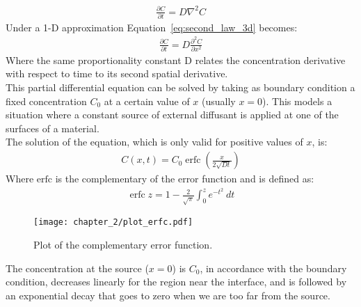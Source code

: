 \begin{align}
   \frac{\partial C}{\partial t}=D\nabla^2C \label{eq:second_law_3d}
\end{align}
Under a 1-D approximation Equation~\ref{eq:second_law_3d} becomes:
\begin{align}
   \frac{\partial C}{\partial t}=D\frac{\partial^2C}{\partial x^2} \label{eq:second_law_1d}
\end{align}
Where the same proportionality constant D relates the concentration derivative with respect to time to its second spatial derivative.
\\
This partial differential equation can be solved by taking as boundary condition a fixed concentration $C_0$ at a certain value of $x$ (usually $x = 0$). This models a situation where a constant source of external diffusant is applied at one of the surfaces of a material.
\\
The solution of the equation, which is only valid for positive values of $x$, is:
\begin{align}
    C\left(x,t\right)=C_0\operatorname{erfc}\left(\frac{x}{2\sqrt{Dt}}\right) \label{eq:fick_solution}
\end{align}
Where $\mathrm{erfc}$ is the complementary of the error function and is defined as:
\begin{align}
   \operatorname{erfc}z=1-\frac{2}{\sqrt\pi}\int_{0}^{z}e^{-t^2}\ dt 
\end{align}

\begin{figure}[H]
    \centering
    \texttt{[image: chapter\_2/plot\_erfc.pdf]}
    \vspace*{-40pt}
    \caption[]{Plot of the complementary error function.}
    \label{fig:plot_erfc}
\end{figure}

The concentration at the source ($x = 0$) is $C_0$, in accordance with the boundary condition, decreases linearly for the region near the interface, and is followed by an exponential decay that goes to zero when we are too far from the source.
